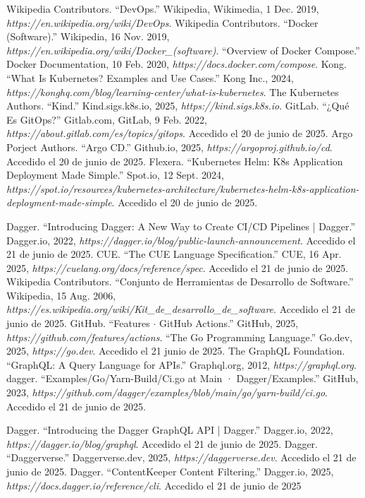 \begin{thebibliography}{99}
 Wikipedia Contributors. ``DevOps.'' Wikipedia, Wikimedia, 1 Dec. 2019, {\it https://en.wikipedia.org/wiki/DevOps}.
 Wikipedia Contributors. ``Docker (Software).'' Wikipedia, 16 Nov. 2019, {\it https://en.wikipedia.org/wiki/Docker\_(software)}.
 ``Overview of Docker Compose.'' Docker Documentation, 10 Feb. 2020, {\it https://docs.docker.com/compose}.
 Kong. ``What Is Kubernetes? Examples and Use Cases.'' Kong Inc., 2024, {\it https://konghq.com/blog/learning-center/what-is-kubernetes}.
 The Kubernetes Authors. ``Kind.'' Kind.sigs.k8s.io, 2025, {\it https://kind.sigs.k8s.io}.
 GitLab. ``¿Qué Es GitOps?'' Gitlab.com, GitLab, 9 Feb. 2022, {\it https://about.gitlab.com/es/topics/gitops}. Accedido el 20 de junio de 2025.
 Argo Porject Authors. ``Argo CD.'' Github.io, 2025, {\it https://argoproj.github.io/cd}. Accedido el 20 de junio de 2025.
 Flexera. ``Kubernetes Helm: K8s Application Deployment Made Simple.'' Spot.io, 12 Sept. 2024, {\it https://spot.io/resources/kubernetes-architecture/kubernetes-helm-k8s-application-deployment-made-simple}. Accedido el 20 de junio de 2025.

 Dagger. ``Introducing Dagger: A New Way to Create CI/CD Pipelines | Dagger.'' Dagger.io, 2022, {\it https://dagger.io/blog/public-launch-announcement}. Accedido el 21 de junio de 2025.
 CUE. ``The CUE Language Specification.'' CUE, 16 Apr. 2025, {\it https://cuelang.org/docs/reference/spec}. Accedido el 21 de junio de 2025.
 Wikipedia Contributors. ``Conjunto de Herramientas de Desarrollo de Software.'' Wikipedia, 15 Aug. 2006, {\it https://es.wikipedia.org/wiki/Kit\_de\_desarrollo\_de\_software}. Accedido el 21 de junio de 2025.
 GitHub. ``Features $\cdot$ GitHub Actions.'' GitHub, 2025, {\it https://github.com/features/actions}.
 ``The Go Programming Language.'' Go.dev, 2025, {\it https://go.dev}. Accedido el 21 junio de 2025.
 The GraphQL Foundation. ``GraphQL: A Query Language for APIs.'' Graphql.org, 2012, {\it https://graphql.org}.
 dagger. ``Examples/Go/Yarn-Build/Ci.go at Main · Dagger/Examples.'' GitHub, 2023, {\it https://github.com/dagger/examples/blob/main/go/yarn-build/ci.go}. Accedido el 21 de junio de 2025.

 Dagger. ``Introducing the Dagger GraphQL API | Dagger.'' Dagger.io, 2022, {\it https://dagger.io/blog/graphql}. Accedido el 21 de junio de 2025.
 Dagger. ``Daggerverse.'' Daggerverse.dev, 2025, {\it https://daggerverse.dev}. Accedido el 21 de junio de 2025.
 Dagger. ``ContentKeeper Content Filtering.'' Dagger.io, 2025, {\it https://docs.dagger.io/reference/cli}. Accedido el 21 de junio de 2025

\end{thebibliography}

